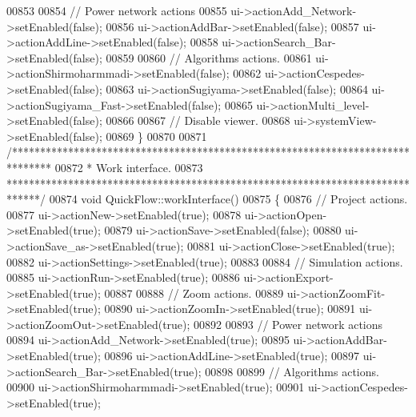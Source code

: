 \begin{DoxyCode}
00853 
00854   \textcolor{comment}{// Power network actions}
00855   ui->actionAdd\_Network->setEnabled(\textcolor{keyword}{false});
00856   ui->actionAddBar->setEnabled(\textcolor{keyword}{false});
00857   ui->actionAddLine->setEnabled(\textcolor{keyword}{false});
00858   ui->actionSearch\_Bar->setEnabled(\textcolor{keyword}{false});
00859 
00860   \textcolor{comment}{// Algorithms actions.}
00861   ui->actionShirmoharmmadi->setEnabled(\textcolor{keyword}{false});
00862   ui->actionCespedes->setEnabled(\textcolor{keyword}{false});
00863   ui->actionSugiyama->setEnabled(\textcolor{keyword}{false});
00864   ui->actionSugiyama\_Fast->setEnabled(\textcolor{keyword}{false});
00865   ui->actionMulti\_level->setEnabled(\textcolor{keyword}{false});
00866 
00867   \textcolor{comment}{// Disable viewer.}
00868   ui->systemView->setEnabled(\textcolor{keyword}{false});
00869 \}
00870 
00871 \textcolor{comment}{/*******************************************************************************}
00872 \textcolor{comment}{ * Work interface.}
00873 \textcolor{comment}{ ******************************************************************************/}
00874 \textcolor{keywordtype}{void} QuickFlow::workInterface()
00875 \{
00876   \textcolor{comment}{// Project actions.}
00877   ui->actionNew->setEnabled(\textcolor{keyword}{true});
00878   ui->actionOpen->setEnabled(\textcolor{keyword}{true});
00879   ui->actionSave->setEnabled(\textcolor{keyword}{false});
00880   ui->actionSave\_as->setEnabled(\textcolor{keyword}{true});
00881   ui->actionClose->setEnabled(\textcolor{keyword}{true});
00882   ui->actionSettings->setEnabled(\textcolor{keyword}{true});
00883 
00884   \textcolor{comment}{// Simulation actions.}
00885   ui->actionRun->setEnabled(\textcolor{keyword}{true});
00886   ui->actionExport->setEnabled(\textcolor{keyword}{true});
00887 
00888   \textcolor{comment}{// Zoom actions.}
00889   ui->actionZoomFit->setEnabled(\textcolor{keyword}{true});
00890   ui->actionZoomIn->setEnabled(\textcolor{keyword}{true});
00891   ui->actionZoomOut->setEnabled(\textcolor{keyword}{true});
00892 
00893   \textcolor{comment}{// Power network actions}
00894   ui->actionAdd\_Network->setEnabled(\textcolor{keyword}{true});
00895   ui->actionAddBar->setEnabled(\textcolor{keyword}{true});
00896   ui->actionAddLine->setEnabled(\textcolor{keyword}{true});
00897   ui->actionSearch\_Bar->setEnabled(\textcolor{keyword}{true});
00898 
00899   \textcolor{comment}{// Algorithms actions.}
00900   ui->actionShirmoharmmadi->setEnabled(\textcolor{keyword}{true});
00901   ui->actionCespedes->setEnabled(\textcolor{keyword}{true});

\end{DoxyCode}
